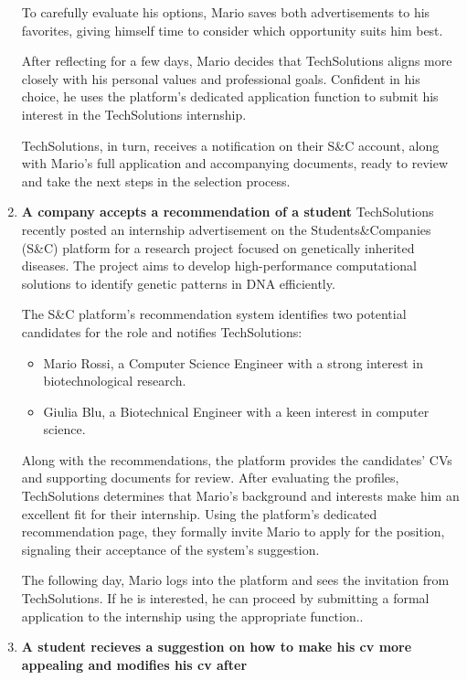 \begin{enumerate}
    To carefully evaluate his options, Mario saves both advertisements to his favorites, giving himself time to consider which opportunity suits him best.

    After reflecting for a few days, Mario decides that TechSolutions aligns more closely with his personal values and professional goals. Confident in his choice, he uses the platform’s dedicated application function to submit his interest in the TechSolutions internship.

    TechSolutions, in turn, receives a notification on their S\&C account, along with Mario’s full application and accompanying documents, ready to review and take the next steps in the selection process.

      \item \textbf{A company accepts a recommendation of a student}
      TechSolutions recently posted an internship advertisement on the Students\&Companies (S\&C) platform for a research project focused on genetically inherited diseases. The project aims to develop high-performance computational solutions to identify genetic patterns in DNA efficiently.

    The S\&C platform’s recommendation system identifies two potential candidates for the role and notifies TechSolutions:

    \begin{itemize}
        \item  Mario Rossi, a Computer Science Engineer with a strong interest in biotechnological research.
        \item Giulia Blu, a Biotechnical Engineer with a keen interest in computer science.
    \end{itemize}
    Along with the recommendations, the platform provides the candidates’ CVs and supporting documents for review. After evaluating the profiles, TechSolutions determines that Mario’s background and interests make him an excellent fit for their internship. Using the platform’s dedicated recommendation page, they formally invite Mario to apply for the position, signaling their acceptance of the system’s suggestion.

    The following day, Mario logs into the platform and sees the invitation from TechSolutions. If he is interested, he can proceed by submitting a formal application to the internship using the appropriate function.. 

     \item \textbf{A student recieves a suggestion on how to make his cv more appealing and modifies his cv after}


\end{enumerate}
